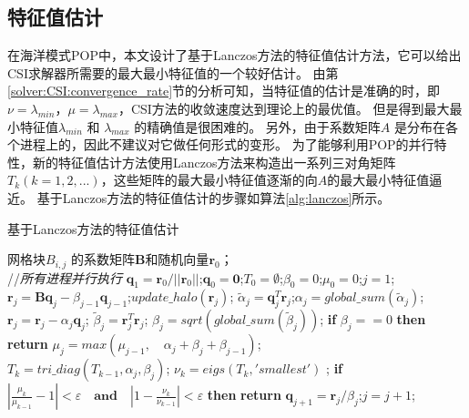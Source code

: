 \subsection{特征值估计}
\label{solver:eigs}
在海洋模式POP中，本文设计了基于Lanczos方法的特征值估计方法，它可以给出CSI求解器所需要的最大最小特征值的一个较好估计。
由第\ref{solver:CSI:convergence_rate}节的分析可知，当特征值的估计是准确的时，即$\nu = \lambda_{min}$，$\mu =\lambda_{max}$，CSI方法的收敛速度达到理论上的最优值。 
但是得到最大最小特征值$\lambda_{min}$ 和 $\lambda_{max}$ 的精确值是很困难的。
另外，由于系数矩阵$A$ 是分布在各个进程上的，因此不建议对它做任何形式的变形。  
为了能够利用POP的并行特性，新的特征值估计方法使用Lanczos方法来构造出一系列三对角矩阵$T_k(k=1,2,...)$，这些矩阵的最大最小特征值逐渐的向$A$的最大最小特征值逼近。
基于Lanczos方法的特征值估计的步骤如算法\ref{alg:lanczos}所示。 
\begin{algorithm}
\caption{ 基于Lanczos方法的特征值估计}
\label{alg:lanczos}
\begin{algorithmic}[1]
\REQUIRE  网格块$B_{i,j}$ 的系数矩阵$\textbf{B}$和随机向量$\textbf{r}_0$；\\
 //\qquad    \textit{所有进程并行执行}
\STATE $\textbf{q}_1 = \textbf{r}_0/||\textbf{r}_0||$;\quad $\textbf{q}_0=\textbf{0}$;\quad $T_0=\emptyset$;\quad $\beta_0 =0$;\quad  $\mu_0 =0$;\quad $j=1$;
\STATE $\textbf{r}_j=\textbf{B}\textbf{q}_j-\beta_{j-1}\textbf{q}_{j-1}$;\quad $update\_halo(\textbf{r}_j)$;
\STATE $\tilde{\alpha}_j =\textbf{q}_j^T\textbf{r}_j$;\quad $\alpha_j=global\_sum(\tilde{\alpha}_j)$; 
\STATE $\textbf{r}_j=\textbf{r}_j-\alpha_{j}\textbf{q}_{j}$;
\STATE $\tilde{\beta}_j = \textbf{r}_j^T\textbf{r}_j$; \quad $\beta_j=sqrt(global\_sum(\tilde{\beta}_j))$;
\STATE \textbf{if} $\beta_j == 0$ \textbf{then} \textbf{return}
\STATE $\mu_j = max(\mu_{j-1}, \quad \alpha_j+\beta_j+\beta_{j-1})$; \label{lanczos_gersh} \\
\STATE $T_k=tri\_diag(T_{k-1},\alpha_j,\beta_j)$; \quad $\nu_k = eigs(T_k,'smallest')$ ; \label{lanczos_tridiag} 
\STATE \textbf{if} $|\frac{\mu_k}{\mu_{k-1}} -1 |< \varepsilon\quad\textbf{and}\quad|1- \frac{\nu_k}{\nu_{k-1}}|< \varepsilon$ \textbf{then} \textbf{return}
\STATE $\textbf{q}_{j+1}= \textbf{r}_j/\beta_j$;\quad $j=j+1$;
\ENDWHILE
\end{algorithmic}
\end{algorithm}
 
